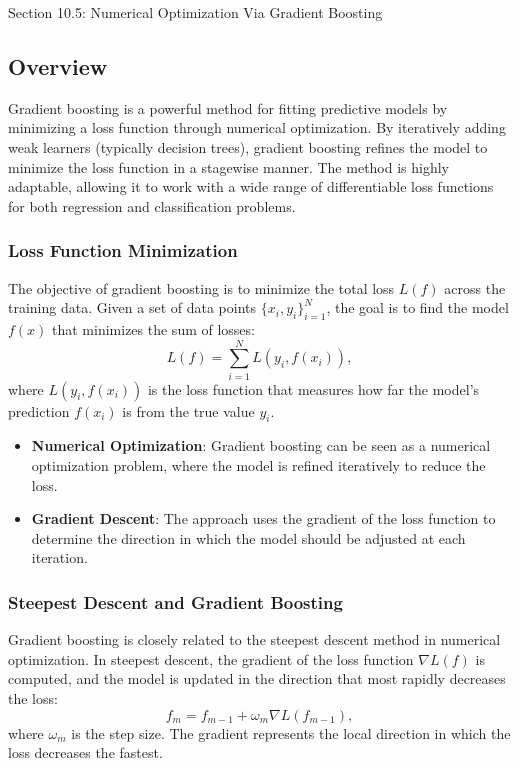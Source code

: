 \begin{notes}{Section 10.5: Numerical Optimization Via Gradient Boosting}
    \subsection*{Overview}

    Gradient boosting is a powerful method for fitting predictive models by minimizing a loss function through numerical optimization. By iteratively adding weak learners (typically decision trees), 
    gradient boosting refines the model to minimize the loss function in a stagewise manner. The method is highly adaptable, allowing it to work with a wide range of differentiable loss functions 
    for both regression and classification problems.
    
    \subsubsection*{Loss Function Minimization}
    
    The objective of gradient boosting is to minimize the total loss $L(f)$ across the training data. Given a set of data points $\{x_i, y_i\}_{i=1}^{N}$, the goal is to find the model $f(x)$ 
    that minimizes the sum of losses:
    \[
    L(f) = \sum_{i=1}^{N} L(y_i, f(x_i)),
    \]
    where $L(y_i, f(x_i))$ is the loss function that measures how far the model's prediction $f(x_i)$ is from the true value $y_i$.
    
    \begin{highlight}
        \begin{itemize}
            \item \textbf{Numerical Optimization}: Gradient boosting can be seen as a numerical optimization problem, where the model is refined iteratively to reduce the loss.
            \item \textbf{Gradient Descent}: The approach uses the gradient of the loss function to determine the direction in which the model should be adjusted at each iteration.
        \end{itemize}
    \end{highlight}
    
    \subsubsection*{Steepest Descent and Gradient Boosting}
    
    Gradient boosting is closely related to the steepest descent method in numerical optimization. In steepest descent, the gradient of the loss function $\nabla L(f)$ is computed, and the model 
    is updated in the direction that most rapidly decreases the loss:
    \[
    f_m = f_{m-1} + \omega_m \nabla L(f_{m-1}),
    \]
    where $\omega_m$ is the step size. The gradient represents the local direction in which the loss decreases the fastest.
    

\end{notes}

